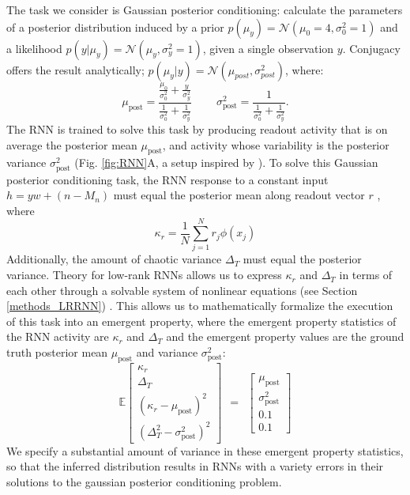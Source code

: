 \documentclass[11pt]{article}
\begin{document}
The task we consider is Gaussian posterior conditioning: calculate the parameters of a posterior distribution induced by a prior $p(\mu_y) = \mathcal{N}(\mu_0=4, \sigma_0^2=1)$ and a likelihood $p(y | \mu_y) = \mathcal{N}(\mu_y,\sigma^2_y = 1)$, given a single observation $y$.  Conjugacy offers the result analytically; $p(\mu_y | y ) = \mathcal{N}\left(\mu_{post},\sigma_{post}^2\right)$, where:   
\begin{equation}
\mu_{\text{post}} = \frac{\frac{\mu_0}{\sigma_0^2} + \frac{y}{\sigma_y^2}}{\frac{1}{\sigma_0^2} + \frac{1}{\sigma_y^2}}
~~~~~~~~~~
 \sigma^2_{\text{post}} = \frac{1}{\frac{1}{\sigma_0^2} + \frac{1}{\sigma_y^2}}.
\end{equation} 
The RNN is trained to solve this task by producing readout activity that is on average the posterior mean $\mu_{\text{post}}$, and activity whose variability is the posterior variance $\sigma^2_{\text{post}}$ (Fig. \ref{fig:RNN}A, a setup inspired by \cite{echeveste2019cortical}). 
To solve this Gaussian posterior conditioning task, the RNN response to a constant input $h = y w + (n-M_n)$ must equal the posterior mean along readout vector $r$ , where
\begin{equation}
\kappa_r =  \frac{1}{N} \sum_{j=1}^N r_j \phi(x_j)
\end{equation}
Additionally, the amount of chaotic variance $\Delta_T$ must equal the posterior variance.
Theory for low-rank RNNs allows us to express $\kappa_r$ and $\Delta_T$ in terms of each other through a solvable system of nonlinear equations  (see Section \ref{methods_LRRNN}) \cite{mastrogiuseppe2018linking}.
This allows us to mathematically formalize the execution of this task into an emergent property, where the emergent property statistics of the RNN activity are $\kappa_r$ and $\Delta_T$ and the emergent property values are the ground truth posterior mean $\mu_{\text{post}}$ and variance $\sigma^2_{\text{post}}$:
\begin{equation}
\mathbb{E} \begin{bmatrix} \kappa_r \\ \Delta_T \\ (\kappa_r-\mu_{\text{post}})^2 \\ (\Delta_T^2-\sigma^2_{\text{post}})^2 \end{bmatrix} ~~=~~ \begin{bmatrix} \mu_{\text{post}} \\ \sigma^2_{\text{post}} \\ 0.1 \\ 0.1 \end{bmatrix}
\end{equation}
We specify a substantial amount of variance in these emergent property statistics, so that the inferred distribution results in RNNs with a variety errors in their solutions to the gaussian posterior conditioning problem. 
\end{document}
